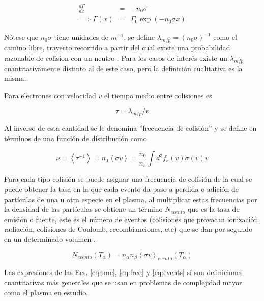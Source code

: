 \documentclass[11pt]{article}
\theoremstyle{definition}
\begin{document}
    \begin{eqnarray}
      \frac{d\Gamma}{dx} &=& -n_0\sigma \nonumber\\
      \implies \Gamma(x) &=& \Gamma_0\exp{(-n_0\sigma x)} \nonumber
    \end{eqnarray}
  
    N\'otese que $n_0\sigma$ tiene unidades de $m^{-1}$, se define $\lambda_{mfp} = (n_0\sigma)^{-1}$ como el camino libre, trayecto recorrido a partir del cual existe una probabilidad razonable de colision con un neutro \cite{goldston1995}. Para los casos de interés existe un $\lambda_{mfp}$ cuantitativamente distinto al de este caso, pero la definici\'on cualitativa es la misma.

  Para electrones con velocidad $v$ el tiempo medio entre colisiones es

  \begin{equation}\label{eq:tmc}
    \tau = \lambda_{mfp}/v
  \end{equation}

  Al inverso de esta cantidad se le denomina ''frecuencia de colisi\'on'' y se define en t\'erminos de una funci\'on de distribuci\'on como
  
  \begin{equation}\label{eq:freq}
    \nu = \left<\tau^{-1}\right> = n_0\left<\sigma v\right> = \frac{n_0}{n_e}\int d^3 f_e(v)\sigma(v)v
  \end{equation}

  Para cada tipo colisi\'on se puede asignar una frecuencia de colisi\'on de la cual se puede obtener la tasa en la que cada evento da paso a perdida o adici\'on de part\'iculas de una u otra especie en el plasma, al multiplicar estas frecuencias por la densidad de las part\'iculas se obtiene un t\'ermino $N_{evento}$ que es la tasa de emisi\'on o fuente, este es el n\'umero de eventos (colisiones que provocan ionizaci\'on, radiaci\'on, colisiones de Coulomb, recombianciones, etc) que se dan por segundo en un determinado volumen \cite{lechte2002}.

  \begin{equation}\label{eq:events}
    N_{evento}(T_\alpha) = n_\alpha n_\beta\left<\sigma v\right>_{evento}(T_\alpha) 
  \end{equation}

  Las expresiones de las Ecs. \eqref{eq:tmc}, \eqref{eq:freq} y \eqref{eq:events} s\'i son definiciones cuantitativas m\'as generales que se usan en problemas de complejidad mayor como el plasma en estudio.
\end{document}
